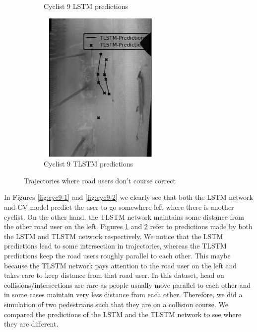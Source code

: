 \documentclass{article}
\begin{document}
\begin{figure}[H]
\begin{subfigure}{0.40\textwidth}
  \caption{Cyclist 9 LSTM predictions}
  \label{fig:cyc9-l}
\end{subfigure}
\begin{subfigure}{0.40\textwidth}
  \centering
  \includegraphics[width=\linewidth]{quali_results/cyc-9-t.png}
  \caption{Cyclist 9 TLSTM predictions}
  \label{fig:cyc9-t}
\end{subfigure}
\caption{Trajectories where road users don't course correct}
\label{fig:cyc9}
\end{figure}

In Figures \ref{fig:cyc9-1} and \ref{fig:cyc9-2} we clearly see that both the LSTM network and CV model predict the user to go somewhere left where there is another cyclist. On the other hand, the TLSTM network maintains some distance from the other road user on the left. Figures \ref{fig:cyc9-l} and \ref{fig:cyc9-t} refer to predictions made by both the LSTM and TLSTM network respectively. We notice that the LSTM predictions lead to some intersection in trajectories, whereas the TLSTM predictions keep the road users roughly parallel to each other. This maybe because the TLSTM network pays attention to the road user on the left and takes care to keep distance from that road user. In this dataset, head on collisions/intersections are rare as people usually move parallel to each other and in some cases maintain very less distance from each other. Therefore, we did a simulation of two pedestrians such that they are on a collision course. We compared the predictions of the LSTM and the TLSTM network to see where they are different. 
\end{document}
